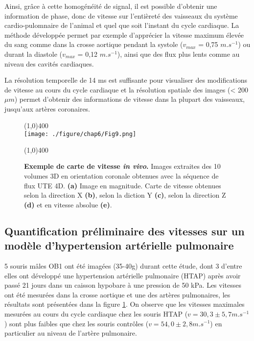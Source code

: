 Ainsi, grâce à cette homogénéité de signal, il est possible d’obtenir une information de phase, donc de vitesse sur l’entièreté des vaisseaux du système cardio-pulomnaire de l’animal et quel que soit l’instant du cycle cardiaque. La méthode développée permet par exemple d’apprécier la vitesse maximum élevée du sang comme dans la crosse aortique  pendant la systole  ($v_{max}$ = 0,75  $m.s^{-1}$) ou durant la diastole ($v_{max}$ = 0,12  $m.s^{-1}$), ainsi que des flux plus lents comme au niveau des cavités cardiaques.

La résolution temporelle de 14 ms est suffisante pour visualiser des modifications de vitesse au cours du cycle cardiaque et la résolution spatiale des images (< 200 $\mu m$) permet d’obtenir des informations de vitesse dans la plupart des vaisseaux, jusqu’aux artères coronaires.
\newpage
\begin{figure}[H]
\centering
\line(1,0){400} \\
\texttt{[image: ./figure/chap6/Fig9.png]}
\caption[Exemple de carte de vitesse \textit{in vivo}]{\label{fig:CarteVitesse}\textbf{Exemple de carte de vitesse \textit{in vivo}.} Images extraites des 10 volumes 3D en orientation coronale obtenues avec la séquence de flux UTE 4D. \textbf{(a)} Image en magnitude. Carte de vitesse obtenues selon la direction X  \textbf{(b)}, selon la diction Y \textbf{(c)}, selon la direction Z \textbf{(d)} et en vitesse absolue \textbf{(e)}.}
\line(1,0){400} \\ 
\end{figure}

\subsection{Quantification préliminaire des vitesses sur un modèle d'hypertension artérielle pulmonaire}

5 souris mâles OB1 ont été imagées (35-40g) durant cette étude, dont 3 d'entre elles ont développé une hypertension artérielle pulmonaire (HTAP) après avoir passé 21 jours dans un caisson hypobare à une pression de 50 kPa.
Les vitesses ont été mesurées dans la crosse aortique et une des artères pulmonaires, les résultats sont présentées dans la figure \ref{fig:CarteVitesse}. On observe que les vitesses maximales mesurées au cours du cycle cardiaque chez les souris HTAP ($v = 30,3 \pm 5,7 m.s^{-1}$) sont plus faibles que chez les souris contrôles ($v = 54,0 \pm 2,8 m.s^{-1}$) en particulier au niveau de l'artère pulmonaire.

